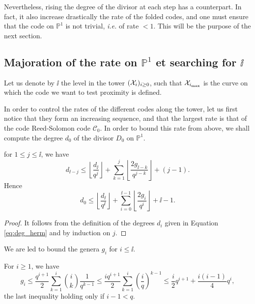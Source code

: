 \documentclass[10pt]{article}
\begin{document}
Nevertheless, rising the degree of the divisor at each step has a counterpart. In fact, it also increase drastically the rate of the folded codes, and one must ensure that the code on $\mathbb{P}^1$ is not trivial, \textit{i.e.} of rate $< 1$. This will be the purpose of the next section. \\



\subsection{Majoration of the rate on $\mathbb{P}^1$ et searching for $\ii$}

Let us denote by $\ii$ the level in the tower $(\mathcal{X}_i)_{i\geq 0}$, such that $\mathcal{X}_{i_{\rm{max}}}$ is the curve on which the code we want to test proximity is defined.

In order to control the rates of the different codes along the tower, let us first notice that they form an increasing sequence, and that the largest rate is that of the code Reed-Solomon code $\mathcal{C}_0$. In order to bound this rate from above, we shall compute the degree $d_0$ of the divisor $D_0$ on $\mathbb{P}^1$. \\

\begin{lemma}\label{lem:deg_herm}
for $1 \leq j \leq \ii$, we have 
\[d_{\ii -j} \leq \left\lfloor \dfrac{d_{\ii}}{q^j}\right\rfloor + \sum\limits_{k=1}^j \left\lfloor \dfrac{2g_{\ii -k}}{q^{j-k}}\right\rfloor + (j-1).\]
Hence 
\[d_0 \leq \left\lfloor \dfrac{d_{\ii}}{q^{\ii}}\right\rfloor + \sum\limits_{i=0}^{\ii-1} \left\lfloor \dfrac{2g_i}{q^{i}}\right\rfloor + \ii-1.\]

\end{lemma}

\begin{proof}
It follows from the definition of the degrees $d_i$ given in Equation \eqref{eq:deg_herm} and by induction on $j$.
\end{proof}

We are led to bound the genera $g_i$ for $i \leq \ii$. 

\begin{proposition}\label{prop:maj_genus_herm}
For $i \geq 1$, we have
\[g_i \leq \dfrac{q^{i+1}}{2} \sum\limits_{k=1}^i \binom{i}{k} \dfrac{1}{q^{k-1}} \leq \dfrac{iq^{i+1}}{2} \sum\limits_{k=1}^i \left(\dfrac{i}{q}\right)^{k-1} \leq \dfrac{i}{2}q^{i+1} + \dfrac{i(i-1)}{4}q^i,\]
the last inequality holding only if $i-1 < q$.
\end{proposition}
\end{document}
